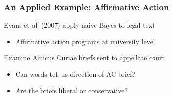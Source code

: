 \documentclass[11pt,compress,professionalfonts]{beamer}
\newcommand{\ita}{\begin{itemize}}
\newcommand{\itm}{\item[]}
\newcommand{\itz}{\end{itemize}}
\begin{document}
\begin{frame}[t,fragile]\frametitle{An Applied Example: Affirmative Action}
Evans et al. (2007) apply naive Bayes to legal text
\ita
\itm Affirmative action programs at university level
\itz
Examine Amicus Curiae briefs sent to appellate court
\ita
\itm Can words tell us direction of AC brief?
\itm Are the briefs liberal or conservative?
\itz


\end{frame}



\end{document}
